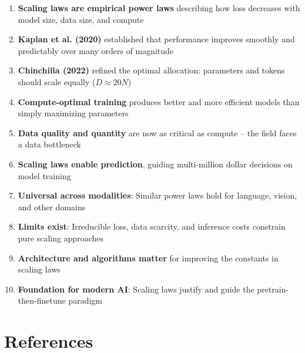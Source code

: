 \documentclass{article}
\begin{document}
\begin{enumerate}
\item \textbf{Scaling laws are empirical power laws} describing how loss decreases with model size, data size, and compute

\item \textbf{Kaplan et al. (2020)} established that performance improves smoothly and predictably over many orders of magnitude

\item \textbf{Chinchilla (2022)} refined the optimal allocation: parameters and tokens should scale equally ($D \approx 20N$)

\item \textbf{Compute-optimal training} produces better and more efficient models than simply maximizing parameters

\item \textbf{Data quality and quantity} are now as critical as compute -- the field faces a data bottleneck

\item \textbf{Scaling laws enable prediction}, guiding multi-million dollar decisions on model training

\item \textbf{Universal across modalities}: Similar power laws hold for language, vision, and other domains

\item \textbf{Limits exist}: Irreducible loss, data scarcity, and inference costs constrain pure scaling approaches

\item \textbf{Architecture and algorithms matter} for improving the constants in scaling laws

\item \textbf{Foundation for modern AI}: Scaling laws justify and guide the pretrain-then-finetune paradigm
\end{enumerate}

\section*{References}
\end{document}
